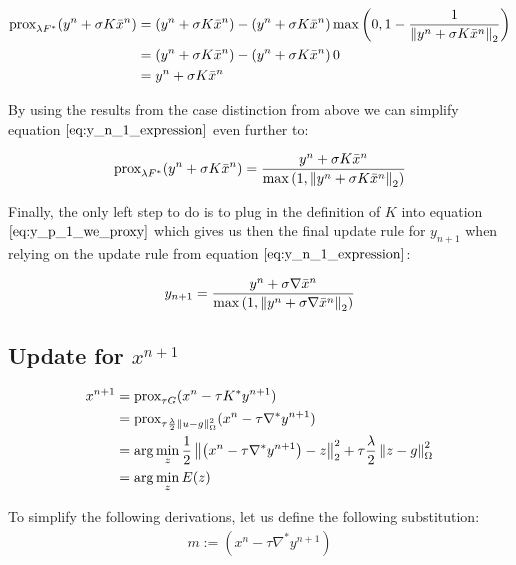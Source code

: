 \begin{itemize}
		\begin{align}
			\text{prox}_{\lambda F^*}(y^n + \sigma K \bar{x}^{n})
			&= (y^n + \sigma K \bar{x}^{n}) - \left( y^n + \sigma K \bar{x}^{n} \right) \max{\left(0, 1-\frac{1}{\left\lVert y^n + \sigma K \bar{x}^{n} \right\rVert_2}\right)} \nonumber \\
			&= (y^n + \sigma K \bar{x}^{n}) - \left( y^n + \sigma K \bar{x}^{n} \right) 0 \nonumber \\
			&= y^n + \sigma K \bar{x}^{n}
		\end{align}
\end{itemize}

By using the results from the case distinction from above we can simplify equation $\ref{eq:y_n_1_expression}$ even further to:

\begin{equation}
	\text{prox}_{\lambda F^*}(y^n + \sigma K \bar{x}^{n}) = \frac{y^n + \sigma K \bar{x}^{n}}{\max{\left(1,\left\lVert y^n + \sigma K \bar{x}^{n}\right\rVert_2 \right)}}
\label{eq:y_p_1_we_proxy}	
\end{equation}

Finally, the only left step to do is to plug in the definition of $K$ into equation $\ref{eq:y_p_1_we_proxy}$ which gives us then the final update rule for $y_{n+1}$ when relying on the update rule from equation $\ref{eq:y_n_1_expression}$:

\begin{align}
	y_{n+1} = \frac{y^n + \sigma \nabla \bar{x}^{n}}{\max{\left(1,\left\lVert y^n + \sigma \nabla \bar{x}^{n}\right\rVert_2 \right)}}
\label{eq:update_rule_y_n_p_1}	
\end{align} 	

\subsection{Update for $x^{n+1}$}

\begin{align}
x^{n+1} &= \text{prox}_{\tau G}(x^n - \tau K^* y^{n+1}) \\
		&= \text{prox}_{\tau \frac{\lambda}{2} \left\lVert u - g\right\rVert_{\Omega}^2 }(x^n - \tau \nabla^* y^{n+1}) \\
	    &= \arg \min_{z} \frac{1}{2} \left\lVert\left(x^n - \tau \nabla^* y^{n+1} \right) - z\right\rVert_2^2 + \tau \frac{\lambda}{2}\left\lVert z - g\right\rVert_{\Omega}^2 \\
	    &= \arg \min_{z} E(z)
\label{eq:energy_x_p_1}	    
\end{align}

To simplify the following derivations, let us define the following substitution: 
\begin{align}
	m := \left(x^n - \tau \nabla^* y^{n+1} \right)
\end{align}

